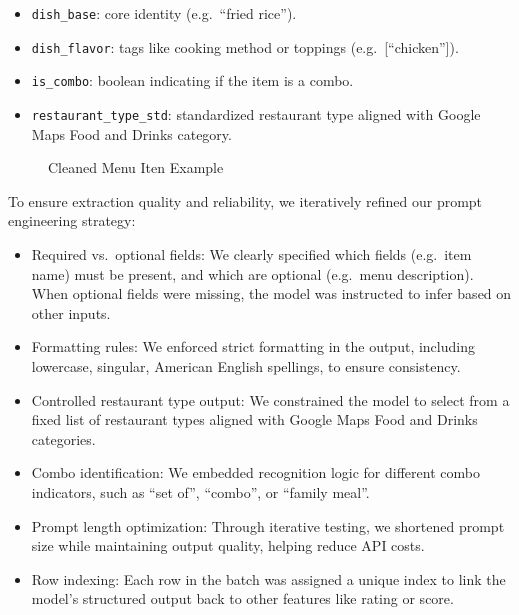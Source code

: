 \documentclass[
  11pt,
  a4paper,
  DIV=11,
  numbers=noendperiod]{scrartcl}
\providecommand{\tightlist}{%
  \setlength{\itemsep}{0pt}\setlength{\parskip}{0pt}}\usepackage{longtable,booktabs,array}
\begin{document}
\begin{itemize}
\tightlist
\item
  \texttt{dish\_base}: core identity (e.g.~``fried rice'').
\item
  \texttt{dish\_flavor}: tags like cooking method or toppings
  (e.g.~{[}``chicken''{]}).
\item
  \texttt{is\_combo}: boolean indicating if the item is a combo.
\item
  \texttt{restaurant\_type\_std}: standardized restaurant type aligned
  with Google Maps Food and Drinks category.
\end{itemize}

\begin{figure}

\caption{\label{fig-cleaned-example}Cleaned Menu Iten Example}


\end{figure}%

To ensure extraction quality and reliability, we iteratively refined our
prompt engineering strategy:

\begin{itemize}
\tightlist
\item
  Required vs.~optional fields: We clearly specified which fields
  (e.g.~item name) must be present, and which are optional (e.g.~menu
  description). When optional fields were missing, the model was
  instructed to infer based on other inputs.
\item
  Formatting rules: We enforced strict formatting in the output,
  including lowercase, singular, American English spellings, to ensure
  consistency.
\item
  Controlled restaurant type output: We constrained the model to select
  from a fixed list of restaurant types aligned with Google Maps Food
  and Drinks categories.
\item
  Combo identification: We embedded recognition logic for different
  combo indicators, such as ``set of'', ``combo'', or ``family meal''.
\item
  Prompt length optimization: Through iterative testing, we shortened
  prompt size while maintaining output quality, helping reduce API
  costs.
\item
  Row indexing: Each row in the batch was assigned a unique index to
  link the model's structured output back to other features like rating
  or score.
\end{itemize}
\end{document}
